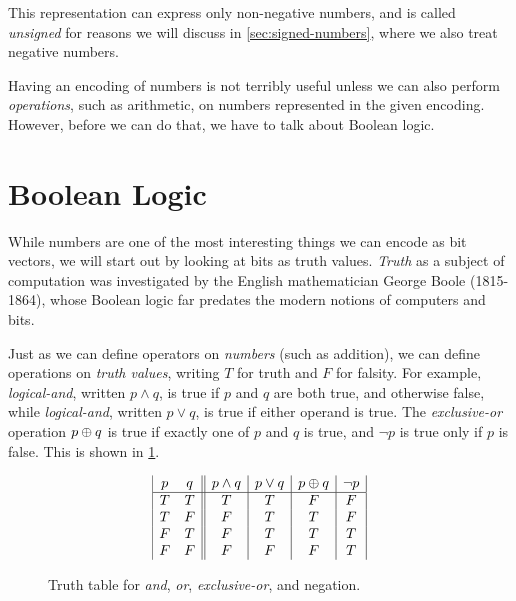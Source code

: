   This representation can express only non-negative numbers, and is
  called \emph{unsigned} for reasons we will discuss in
  \cref{sec:signed-numbers}, where we also treat negative numbers.

  Having an encoding of numbers is not terribly useful unless we can
  also perform \emph{operations}, such as arithmetic, on numbers
  represented in the given encoding.  However, before we can do that,
  we have to talk about Boolean logic.

\section{Boolean Logic}
\label{sec:boolean-logic}

While numbers are one of the most interesting things we can encode as
bit vectors, we will start out by looking at bits as truth values.
\emph{Truth} as a subject of computation was investigated by the
English mathematician George Boole (1815-1864), whose Boolean logic
far predates the modern notions of computers and bits.

Just as we can define operators on \emph{numbers} (such as addition),
we can define operations on \emph{truth values}, writing $T$ for truth
and $F$ for falsity.  For example, \emph{logical-and}, written
$p \land q$, is true if $p$ and $q$ are both true, and otherwise
false, while \emph{logical-and}, written $p \lor q$, is true if either
operand is true.  The \emph{exclusive-or} operation $p \oplus q$ is
true if exactly one of $p$ and $q$ is true, and $\neg p$ is true only
if $p$ is false.  This is shown in \cref{fig:truth-tables}.

\begin{figure}
  \centering

  \begin{displaymath}
\begin{array}{|c c||c|c|c|c|}
p & q & p \land q & p \lor q & p \oplus q & \neg p \\
\hline
T & T & T & T & F & F\\
T & F & F & T & T & F\\
F & T & F & T & T & T\\
F & F & F & F & F & T\\
\end{array}
\end{displaymath}
  \caption{Truth table for \emph{and}, \emph{or}, \emph{exclusive-or}, and negation.}
  \label{fig:truth-tables}
\end{figure}

